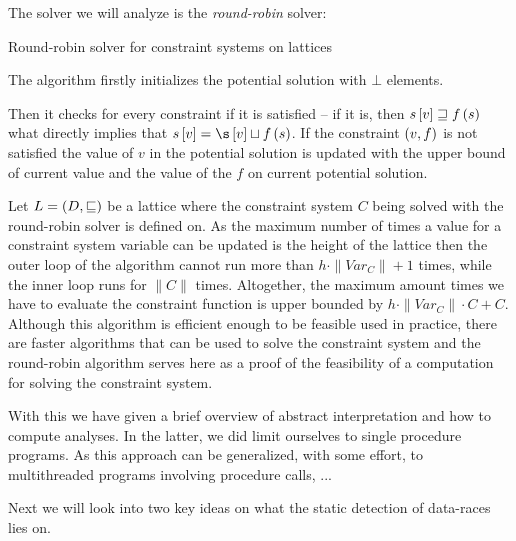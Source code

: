 \documentclass[..thesis.tex]{subfiles}
\begin{document}
The solver we will analyze is the \textit{round-robin} solver:


\begin{algorithm}[H]
\label{round-robin}
\caption{Round-robin solver for constraint systems on lattices}
\end{algorithm}
The algorithm firstly initializes the potential solution with $\bot$ elements.

Then it checks for every constraint if it is satisfied -- if it is, then $s \left[ v \right] \sqsupseteq f \left( s \right)$ what directly implies that $s \lbk v \rbk = \s \lbk v \rbk \sqcup f \lp s \rp$. If the constraint $\left( v, f \right)$  is not satisfied the value of $v$ in the potential solution is updated with the upper bound of current value and the value of the $f$ on current potential solution.

Let $L = \left( D, \sqsubseteq \right)$ be a lattice where the constraint system $C$ being solved with the round-robin solver is defined on. As the maximum number of times a value for a constraint system variable can be updated is the height of the lattice then the outer loop of the algorithm cannot run more than $h \cdot \| Var_C \| + 1$ times, while the inner loop runs for $\| C \|$ times. Altogether, the maximum amount times we have to evaluate the constraint function is upper bounded by $h \cdot \| Var_C\| \cdot C + C$. Although this algorithm is efficient enough to be feasible used in practice, there are faster algorithms that can be used to solve the constraint system and the round-robin algorithm serves here as a proof of the feasibility of a computation for solving the constraint system.


With this we have given a brief overview of abstract interpretation and how to compute analyses. In the latter, we did limit ourselves to single procedure programs. As this approach can be generalized, with some effort, to multithreaded programs involving procedure calls, ...


Next we will look into two key ideas on what the static detection of data-races lies on.
\end{document}
